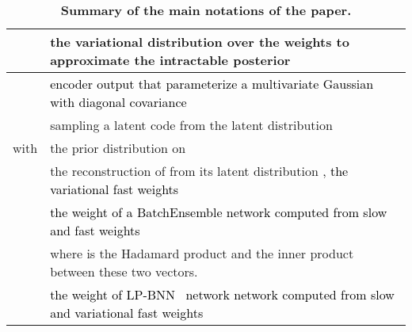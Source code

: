 \documentclass[10pt,twocolumn,letterpaper]{article}
\newcommand\Gianni{\textcolor{black}}
\newcommand{\ab}[1]{\textcolor{black}{#1}}
\newcommand{\method}{LP-BNN\xspace}
\begin{document}
\begin{table*}[!t]
{\begin{tabular}{ll}
 & the variational distribution over the weights  to approximate the intractable posterior    \\ \midrule
  & \ab{encoder output that parameterize a multivariate Gaussian with diagonal covariance} \\ \midrule
  &  sampling a latent code  from the latent distribution \\
\midrule
 with  & the prior distribution on   \\ 
\midrule
 &  the reconstruction of  from its latent distribution \ab{, \ie the variational fast weights}  \\ 
\midrule 
\Gianni{} & \ab{the weight of a BatchEnsemble network  computed from slow and fast weights}  \\
& where  is the Hadamard product and  \ab{} the inner product between these two vectors.\\
\midrule
\Gianni{}&  \ab{the weight  of \method~ network network  computed from slow and variational fast weights} \\
\bottomrule
\end{tabular}
}
\caption{\textbf{Summary of the main notations of the paper.}}
\label{table:tab1}
\end{table*}













 
\end{document}
